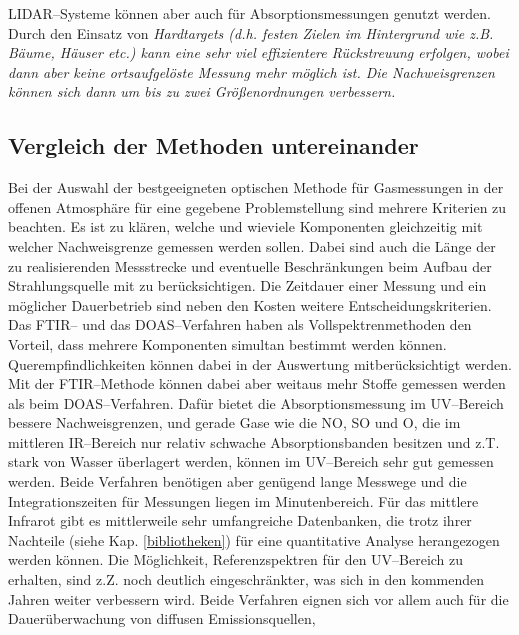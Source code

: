 LIDAR--Systeme können aber auch für Absorptionsmessungen genutzt
werden. Durch den Einsatz von \it Hardtargets \rm (d.h. festen
Zielen im Hintergrund wie z.B. Bäume, Häuser etc.) kann eine sehr
viel effizientere Rückstreuung erfolgen, wobei dann aber keine
ortsaufgelöste Messung mehr möglich ist. Die Nachweisgrenzen
können sich dann um bis zu zwei Grö{\ss}enordnungen verbessern.\\


\subsection{\label{vergl}Vergleich der Methoden untereinander}

Bei der Auswahl der bestgeeigneten optischen Methode für
Gasmessungen in der offenen Atmosphäre für eine gegebene
Problemstellung sind mehrere Kriterien zu beachten. Es ist zu
klären, welche und wieviele Komponenten gleichzeitig mit welcher
Nachweisgrenze gemessen werden sollen. Dabei sind auch die Länge
der zu realisierenden Messstrecke und eventuelle Beschränkungen
beim Aufbau der Strahlungsquelle mit zu berücksichtigen. Die
Zeitdauer einer Messung und ein möglicher Dauerbetrieb sind neben
den Kosten weitere Entscheidungskriterien.\\

Das FTIR-- und das DOAS--Verfahren haben als Vollspektrenmethoden
den Vorteil, dass mehrere Komponenten simultan bestimmt werden
können. Querempfindlichkeiten können dabei in der Auswertung
mitberücksichtigt werden. Mit der FTIR--Methode können dabei aber
weitaus mehr Stoffe gemessen werden als beim DOAS--Verfahren.
Dafür bietet die Absorptionsmessung im UV--Bereich bessere
Nachweisgrenzen, und gerade Gase wie die NO, SO
und O, die im mittleren IR--Bereich nur relativ schwache
Absorptionsbanden besitzen und z.T. stark von Wasser überlagert
werden, können im UV--Bereich sehr gut gemessen werden. Beide
Verfahren benötigen aber genügend lange Messwege und die
Integrationszeiten für Messungen liegen im Minutenbereich. Für das
mittlere Infrarot gibt es mittlerweile sehr umfangreiche
Datenbanken, die trotz ihrer Nachteile (siehe Kap.
\ref{bibliotheken}) für eine quantitative Analyse herangezogen
werden können. Die Möglichkeit, Referenzspektren für den
UV--Bereich zu erhalten, sind z.Z. noch deutlich eingeschränkter,
was sich in den kommenden Jahren weiter verbessern wird. Beide
Verfahren eignen sich vor allem auch für die Dauerüberwachung von
diffusen Emissionsquellen,\\

